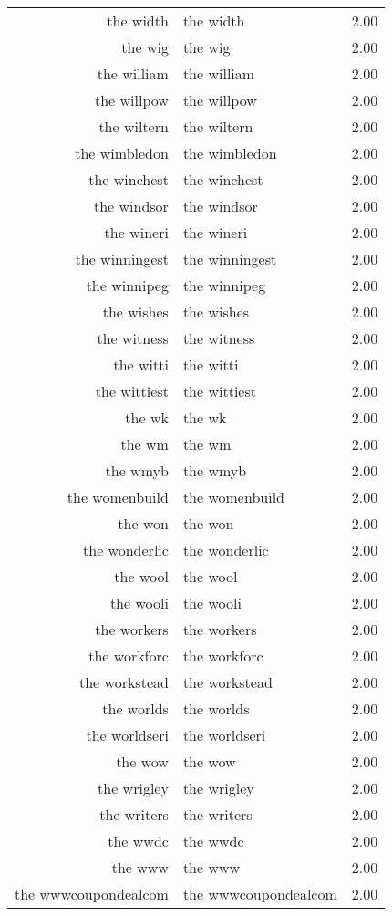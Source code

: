 \begin{table}[ht]
\begin{tabular}{rlr}
  the width & the width & 2.00 \\ 
  the wig & the wig & 2.00 \\ 
  the william & the william & 2.00 \\ 
  the willpow & the willpow & 2.00 \\ 
  the wiltern & the wiltern & 2.00 \\ 
  the wimbledon & the wimbledon & 2.00 \\ 
  the winchest & the winchest & 2.00 \\ 
  the windsor & the windsor & 2.00 \\ 
  the wineri & the wineri & 2.00 \\ 
  the winningest & the winningest & 2.00 \\ 
  the winnipeg & the winnipeg & 2.00 \\ 
  the wishes & the wishes & 2.00 \\ 
  the witness & the witness & 2.00 \\ 
  the witti & the witti & 2.00 \\ 
  the wittiest & the wittiest & 2.00 \\ 
  the wk & the wk & 2.00 \\ 
  the wm & the wm & 2.00 \\ 
  the wmyb & the wmyb & 2.00 \\ 
  the womenbuild & the womenbuild & 2.00 \\ 
  the won & the won & 2.00 \\ 
  the wonderlic & the wonderlic & 2.00 \\ 
  the wool & the wool & 2.00 \\ 
  the wooli & the wooli & 2.00 \\ 
  the workers & the workers & 2.00 \\ 
  the workforc & the workforc & 2.00 \\ 
  the workstead & the workstead & 2.00 \\ 
  the worlds & the worlds & 2.00 \\ 
  the worldseri & the worldseri & 2.00 \\ 
  the wow & the wow & 2.00 \\ 
  the wrigley & the wrigley & 2.00 \\ 
  the writers & the writers & 2.00 \\ 
  the wwdc & the wwdc & 2.00 \\ 
  the www & the www & 2.00 \\ 
  the wwwcoupondealcom & the wwwcoupondealcom & 2.00 \\ 

\end{tabular}
\end{table}
